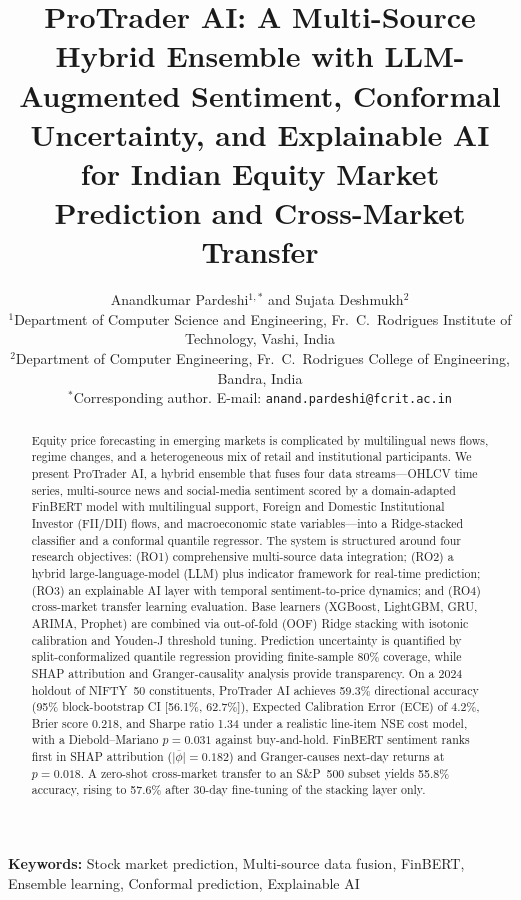 \documentclass[12pt,a4paper]{article}
\title{\textbf{ProTrader AI: A Multi-Source Hybrid Ensemble with
LLM-Augmented Sentiment, Conformal Uncertainty, and Explainable AI
for Indian Equity Market Prediction and Cross-Market Transfer}}
\author{
Anandkumar Pardeshi$^{1,*}$ and Sujata Deshmukh$^{2}$\\[0.4em]
\small $^{1}$Department of Computer Science and Engineering,
Fr.\ C.\ Rodrigues Institute of Technology, Vashi, India\\
\small $^{2}$Department of Computer Engineering,
Fr.\ C.\ Rodrigues College of Engineering, Bandra, India\\
\small $^{*}$Corresponding author.
E-mail: \texttt{anand.pardeshi@fcrit.ac.in}
}
\date{}
\begin{document}
\maketitle
\doublespacing
\linenumbers

\begin{abstract}
\noindent
Equity price forecasting in emerging markets is complicated by multilingual
news flows, regime changes, and a heterogeneous mix of retail and institutional
participants. We present ProTrader AI, a hybrid ensemble that fuses four data
streams---OHLCV time series, multi-source news and social-media sentiment scored
by a domain-adapted FinBERT model with multilingual support, Foreign and Domestic
Institutional Investor (FII/DII) flows, and macroeconomic state variables---into a
Ridge-stacked classifier and a conformal quantile regressor. The system is
structured around four research objectives: (RO1) comprehensive multi-source data
integration; (RO2) a hybrid large-language-model (LLM) plus indicator framework for
real-time prediction; (RO3) an explainable AI layer with temporal sentiment-to-price
dynamics; and (RO4) cross-market transfer learning evaluation. Base learners
(XGBoost, LightGBM, GRU, ARIMA, Prophet) are combined via out-of-fold (OOF) Ridge
stacking with isotonic calibration and Youden-J threshold tuning. Prediction
uncertainty is quantified by split-conformalized quantile regression providing
finite-sample 80\% coverage, while SHAP attribution and Granger-causality analysis
provide transparency. On a 2024 holdout of NIFTY~50 constituents, ProTrader AI
achieves 59.3\% directional accuracy (95\% block-bootstrap CI [56.1\%, 62.7\%]),
Expected Calibration Error (ECE) of 4.2\%, Brier score 0.218, and Sharpe ratio
1.34 under a realistic line-item NSE cost model, with a Diebold--Mariano $p=0.031$
against buy-and-hold. FinBERT sentiment ranks first in SHAP attribution
($\overline{|\phi|}=0.182$) and Granger-causes next-day returns at $p=0.018$. A
zero-shot cross-market transfer to an S\&P~500 subset yields 55.8\% accuracy,
rising to 57.6\% after 30-day fine-tuning of the stacking layer only.
\end{abstract}

\noindent\textbf{Keywords:} Stock market prediction, Multi-source data fusion,
FinBERT, Ensemble learning, Conformal prediction, Explainable AI

\end{document}

